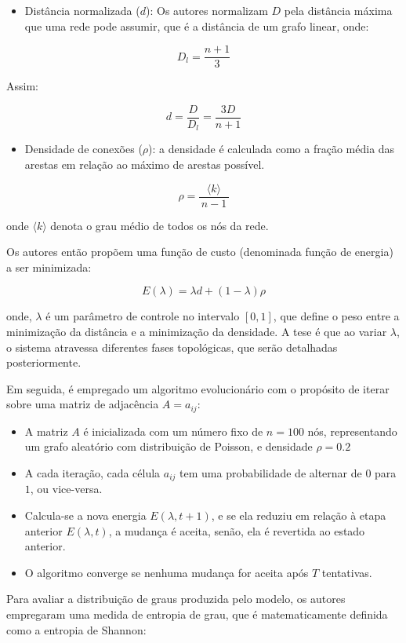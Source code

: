 \documentclass[12pt,oneside,a4paper,brazil,sumario=tradicional]{abntex2}
\begin{document}
\begin{itemize}
  \item Distância normalizada ($d$): Os autores normalizam $D$ pela distância máxima que uma rede pode assumir, que é a distância de um grafo linear, onde:
\end{itemize}
\[D_{l} = \frac{n+1}{3}\]

Assim:

\[d = \frac{D}{D_{l}} = \frac{3D}{n+1}\]

\begin{itemize}
  \item Densidade de conexões ($\rho$): a densidade é calculada como a fração média das arestas em relação ao máximo de arestas possível.
\end{itemize}
\[\rho = \frac{\langle k \rangle}{\,n-1\,}\]

onde $\langle k \rangle$ denota o grau médio de todos os nós da rede.

Os autores então propõem uma função de custo (denominada função de energia) a ser minimizada:

\[E(\lambda) = \lambda d + (1-\lambda)\rho\]

onde, $\lambda$ é um parâmetro de controle no intervalo $[0,1]$, que define o peso entre a minimização da distância e a minimização da densidade. A tese é que ao variar $\lambda$, o sistema atravessa diferentes fases topológicas, que serão detalhadas posteriormente.

Em seguida, é empregado um algoritmo evolucionário com o propósito de iterar sobre uma matriz de adjacência $A = a_{ij}$:

\begin{itemize}
  \item A matriz $A$ é inicializada com um número fixo de $n = 100$ nós, representando um grafo aleatório com distribuição de Poisson, e densidade $\rho = 0.2$
  \item A cada iteração, cada célula $a_{ij}$ tem uma probabilidade de alternar de $0$ para $1$, ou vice-versa.
  \item Calcula-se a nova energia $E(\lambda, t+1)$, e se ela reduziu em relação à etapa anterior $E(\lambda, t)$, a mudança é aceita, senão, ela é revertida ao estado anterior.
  \item O algoritmo converge se nenhuma mudança for aceita após $T$ tentativas.
\end{itemize}

Para avaliar a distribuição de graus produzida pelo modelo, os autores empregaram uma medida de entropia de grau, que é matematicamente definida como a entropia de Shannon:
\end{document}
